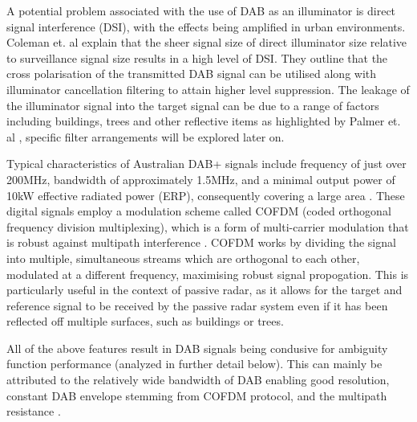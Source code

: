 \documentclass[12pt,a4paper]{article}
\begin{document}
\par \vspace{0.5cm} 
\noindent A potential problem associated with the use of DAB as an illuminator is direct signal interference (DSI), with the effects being amplified in urban environments. Coleman et. al \cite{DABfeatures} explain that the sheer signal size of direct illuminator size relative to surveillance signal size results in a high level of DSI. They outline that the cross polarisation of the transmitted DAB signal can be utilised along with illuminator cancellation filtering to attain higher level suppression. The leakage of the illuminator signal into the target signal can be due to a range of factors including buildings, trees and other reflective items as highlighted by Palmer et. al \cite{DTSO2009}, specific filter arrangements will be explored later on.

\par \vspace{0.5cm} 
\noindent Typical characteristics of Australian DAB+ signals include frequency of just over 200MHz, bandwidth of approximately 1.5MHz, and a minimal output power of 10kW effective radiated power (ERP), consequently covering a large area \cite{DABfeatures}. These digital signals employ a modulation scheme called COFDM (coded orthogonal frequency division multiplexing), which is a form of multi-carrier modulation that is robust against multipath interference \cite{INTRO2017}. COFDM works by dividing the signal into multiple, simultaneous streams which are orthogonal to each other, modulated at a different frequency, maximising robust signal propogation. This is particularly useful in the context of passive radar, as it allows for the target and reference signal to be received by the passive radar system even if it has been reflected off multiple surfaces, such as buildings or trees.

\par \vspace{0.5cm} 
\noindent All of the above features result in DAB signals being condusive for ambiguity function performance (analyzed in further detail below). This can mainly be attributed to the relatively wide bandwidth of DAB enabling good resolution, constant DAB envelope stemming from COFDM protocol, and the multipath resistance \cite{DABambiguity}.
\end{document}
